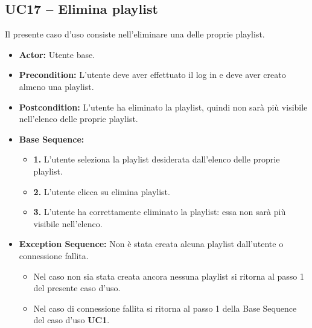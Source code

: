 \subsection{UC17 -- Elimina playlist}
Il presente caso d'uso consiste nell'eliminare una delle proprie playlist.
\begin{itemize}
    \item \textbf{Actor:} Utente base.
    \item \textbf{Precondition:} L'utente deve aver effettuato il log in e deve aver creato almeno una playlist.
    \item \textbf{Postcondition:} L'utente ha eliminato la playlist, quindi non sarà più visibile nell'elenco delle proprie playlist.
    \item \textbf{Base Sequence:}
    \begin{itemize}
        \item \textbf{1.} L'utente seleziona la playlist desiderata dall'elenco delle proprie playlist.
        \item \textbf{2.} L'utente clicca su elimina playlist.
        \item \textbf{3.} L'utente ha correttamente eliminato la playlist: essa non sarà più visibile nell'elenco.
    \end{itemize}
    \item \textbf{Exception Sequence:} Non è stata creata alcuna playlist dall'utente o connessione fallita.
    \begin{itemize}
        \item Nel caso non sia stata creata ancora nessuna playlist si ritorna al passo 1 del presente caso d'uso.
        \item Nel caso di connessione fallita si ritorna al passo 1 della Base Sequence del caso d'uso \textbf{UC1}.
    \end{itemize}
\end{itemize}
\vspace{1cm}

